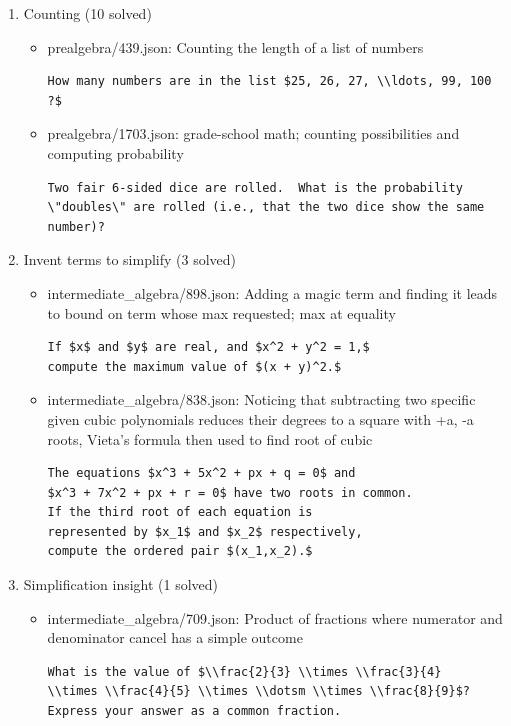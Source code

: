 \documentclass[11pt,a4paper]{article}
\begin{document}
\begin{enumerate}
  \item Counting (10 solved)
    \begin{itemize}
      \item prealgebra/439.json: Counting the length of a list of numbers
\begin{verbatim}
How many numbers are in the list $25, 26, 27, \\ldots, 99, 100 ?$
\end{verbatim}
      \item prealgebra/1703.json: grade-school math; counting possibilities and computing probability
\begin{verbatim}
Two fair 6-sided dice are rolled.  What is the probability
\"doubles\" are rolled (i.e., that the two dice show the same number)?
\end{verbatim}
    \end{itemize}

  \item Invent terms to simplify (3 solved)
    \begin{itemize}
      \item intermediate\_algebra/898.json: Adding a magic term and finding it leads to bound on term whose max requested; max at equality
\begin{verbatim}
If $x$ and $y$ are real, and $x^2 + y^2 = 1,$
compute the maximum value of $(x + y)^2.$
\end{verbatim}
      \item intermediate\_algebra/838.json: Noticing that subtracting two specific given cubic polynomials reduces their degrees to a square with +a, -a roots, Vieta’s formula then used to find root of cubic
\begin{verbatim}
The equations $x^3 + 5x^2 + px + q = 0$ and
$x^3 + 7x^2 + px + r = 0$ have two roots in common.
If the third root of each equation is
represented by $x_1$ and $x_2$ respectively,
compute the ordered pair $(x_1,x_2).$
\end{verbatim}
    \end{itemize}

  \item Simplification insight (1 solved)
    \begin{itemize}
      \item intermediate\_algebra/709.json: Product of fractions where numerator and denominator cancel has a simple outcome
\begin{verbatim}
What is the value of $\\frac{2}{3} \\times \\frac{3}{4}
\\times \\frac{4}{5} \\times \\dotsm \\times \\frac{8}{9}$?
Express your answer as a common fraction.
\end{verbatim}
    \end{itemize}


\end{enumerate}
\end{document}
